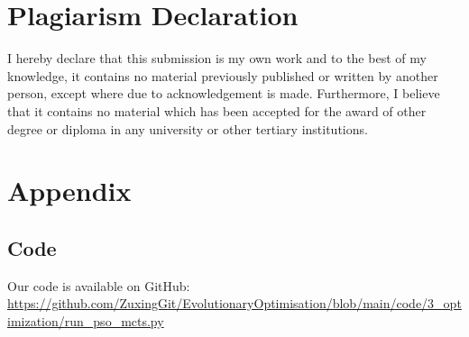 \documentclass[]{article}
\begin{document}
\section{Plagiarism Declaration}
I hereby declare that this submission is my own work and to the best of my knowledge, it contains no material previously published or written by another person, except where due to acknowledgement is made. Furthermore, I believe that it contains no material which has been accepted for the award of other degree or diploma in any university or other tertiary institutions.

\newpage



\appendix
\section{Appendix}
\subsection{Code}
Our code is available on GitHub: \url{https://github.com/ZuxingGit/EvolutionaryOptimisation/blob/main/code/3_optimization/run_pso_mcts.py}
\end{document}
